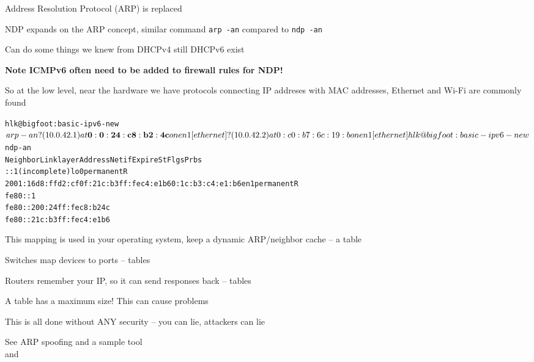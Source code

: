 \documentclass[Screen16to9,17pt]{foils}
\begin{document}


\begin{list1}
\item Address Resolution Protocol (ARP) is replaced
\item NDP expands on the ARP concept, similar command \verb+arp -an+ compared to \verb+ndp -an+
\item Can do some things we knew from DHCPv4 still DHCPv6 exist
\item {\bf Note ICMPv6 often need to be added to firewall rules for NDP!} {\myalert}
\end{list1}


So at the low level, near the hardware we have protocols connecting IP addreses with MAC addresses, Ethernet and Wi-Fi are commonly found

\begin{alltt}
\small
hlk@bigfoot:basic-ipv6-new$ arp -an
? (10.0.42.1) at{\bf 0:0:24:c8:b2:4c} on en1 [ethernet]
? (10.0.42.2) at 0:c0:b7:6c:19:b on en1 [ethernet]

hlk@bigfoot:basic-ipv6-new$ ndp -an
Neighbor                      Linklayer Address  Netif Expire    St Flgs Prbs
::1                           (incomplete)         lo0 permanent R
2001:16d8:ffd2:cf0f:21c:b3ff:fec4:e1b6 0:1c:b3:c4:e1:b6 en1 permanent R
fe80::1%lo0                   (incomplete)         lo0 permanent R
fe80::200:24ff:fec8:b24c%en1 {\bf 0:0:24:c8:b2:4c}      en1 8h54m51s  S  R
fe80::21c:b3ff:fec4:e1b6%en1  0:1c:b3:c4:e1:b6     en1 permanent R
\end{alltt}


\begin{list2}
\item This mapping is used in your operating system, keep a dynamic ARP/neighbor cache -- a table
\item Switches map devices to ports -- tables
\item Routers remember your IP, so it can send responses back -- tables
\item A table has a maximum size! This can cause problems {\myalert}
\item This is all done without ANY security -- you can lie, attackers can lie
\item See ARP spoofing and a sample tool  \\
and 
\end{list2}
\end{document}
